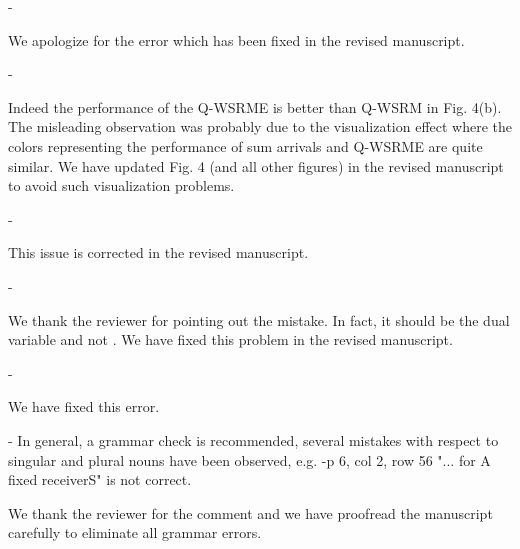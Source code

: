 \begin{enumerate}
\begin{enumerate}
	 - 
	
	\resp We apologize for the error which has been fixed in the revised manuscript.
	
	 - 
	
	\resp Indeed the performance of the Q-WSRME is better than Q-WSRM in Fig. 4(b). The misleading observation was probably due to the visualization effect where the colors representing the performance of sum arrivals and Q-WSRME are quite similar. We have updated Fig. 4 (and all other figures) in the revised manuscript to avoid such visualization problems.
	
	 - 
	
	\resp This issue is corrected in the revised manuscript.
	
	 - 
	
	\resp We thank the reviewer for pointing out the mistake. In fact, it should be the dual variable  and not . We have fixed this problem in the revised manuscript.
	
	 - 	
	
	\resp We have fixed this error.
	
	 - {In general, a grammar check is recommended, several mistakes with respect to singular and plural nouns have been observed, e.g. -p 6, col 2, row 56 "... for A fixed receiverS" is not correct.}
	
	\resp We thank the reviewer for the comment and we have proofread the manuscript carefully to eliminate all grammar errors.
	
\end{enumerate}

\end{enumerate}

